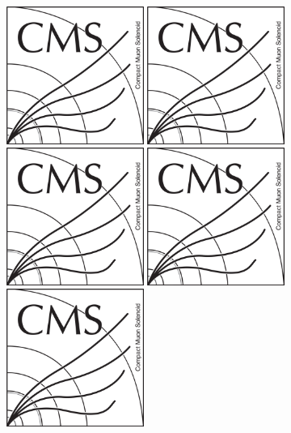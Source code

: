 \begin{figure}[!Hhtbp]
  \begin{center}
    \includegraphics[width=0.4\textwidth]{figs/CMSlogo.png}
    \includegraphics[width=0.4\textwidth]{figs/CMSlogo.png}
    \includegraphics[width=0.4\textwidth]{figs/CMSlogo.png}
    \includegraphics[width=0.4\textwidth]{figs/CMSlogo.png}
    \includegraphics[width=0.4\textwidth]{figs/CMSlogo.png}

\end{center}
\end{figure}
